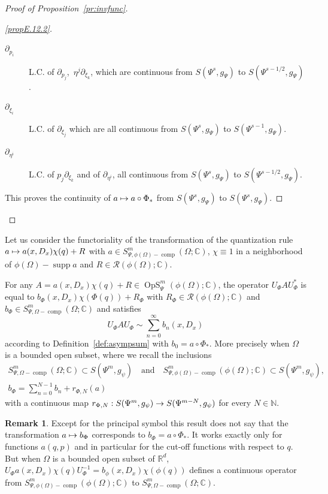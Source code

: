 \documentclass[10pt]{amsart}
\theoremstyle{definition}\newtheorem{defi}[theo]{Definition}\newtheorem{rema}[theo]{Remark}\newtheorem{exam}[theo]{Example}\newtheorem{exem}[theo]{Example}\newtheorem{nota}[theo]{Notation}
\newcommand{\C}{\mathbb{C}}
\newcommand{\R}{\mathbb{R}}
\newcommand{\N}{\mathbb{N}}
\newcommand{\clR}{\mathcal{R}}
\DeclareMathOperator{\OpS}{OpS}
\DeclareMathOperator{\ccomp}{comp}
\DeclareMathOperator{\suppp}{supp}
\renewcommand*{\to}{\mathchoice{\longrightarrow}{\rightarrow}{\rightarrow}{\rightarrow}}
\let\oldmapsto\mapsto
\renewcommand*{\mapsto}{\mathchoice{\longmapsto}{\oldmapsto}{\oldmapsto}{\oldmapsto}}
\newenvironment{proofc}[1][\proofname]{\begin{proof}[#1]}{\end{proof}}
\begin{document}
\begin{proofc}[{Proof of Proposition~\ref{pr:invfunc}}]
\begin{proof}[{\eqref{propE.12.2}}]
\begin{description}
\item[$\partial_{p_{i}}$] L.C. of $\partial_{p_{j}}$,\, $\eta^{j}\partial_{\xi_{k}}$, which are continuous from $S(\Psi^{s},g_{\Psi})$ to $S(\Psi^{s-1/2},g_{\Psi})$.
\item[$\partial_{\xi_{i}}$] L.C. of $\partial_{\xi_{j}}$ which are all continuous from $S(\Psi^{s},g_{\Psi})$ to $S(\Psi^{s-1},g_{\Psi})$.
\item[$\partial_{\eta^{i}}$] L.C. of $p_{j}\partial_{\xi_{k}}$ and of $\partial_{\eta^{i}}$, all continuous from $S(\Psi^{s},g_{\Psi})$ to $S(\Psi^{s-1/2},g_{\Psi})$.
\end{description} This proves the continuity of $a\mapsto a\circ \Phi_{*}$ from $S(\Psi^{s},g_{\Psi})$ to $S(\Psi^{s},g_{\Psi})$.
\end{proof}
\let\qed\relax
\end{proofc}

Let us consider the functoriality of the transformation of the quantization rule $a\mapsto a(x,D_{x})\chi(q)+R$ with $a\in S^{m}_{\Psi,\phi(\Omega)-\ccomp}(\Omega;\C)$, $\chi\equiv 1$ in a neighborhood of $\phi(\Omega)-\suppp a$ and $R\in \clR(\phi(\Omega);\C)$.

\pagebreak
\begin{prop}\label{pr:quantchang}
For any $A=a(x,D_{x})\chi(q)+R\in \OpS^{m}_{\Psi}(\phi(\Omega);\C)$, the operator $U_{\Phi}AU_{\Phi}^{*}$ is equal to $b_{\Phi}(x,D_{x})\chi(\Phi(q))+R_{\Phi}$ with $R_{\Phi}\in \clR(\phi(\Omega);\C)$ and $b_{\Phi}\in S^{m}_{\Psi,\Omega-\ccomp}(\Omega;\C)$ and satisfies
\[
U_{\Phi}AU_{\Phi}\sim \sum_{n=0}^{\infty} b_{n}(x,D_{x})
\]
according to Definition~\ref{def:asympsum} with $b_{0}=a\circ{\Phi}_{*}$. More precisely when $\Omega$ is a bounded open subset, where we recall the inclusions 
\begin{gather*}
S^{m}_{\Psi,\Omega-\ccomp}(\Omega;\C)\subset S(\Psi^{m},g_{\psi}) \quad\text{and}\quad S^{m}_{\Psi,\phi(\Omega)-\ccomp}(\phi(\Omega);\C)\subset S(\Psi^{m},g_{\psi}),\\
b_{\Phi}=\sum_{n=0}^{N-1}b_{n}+r_{\Phi,N}(a)
\end{gather*}
with a continuous map $r_{\Phi,N}:S(\Psi^{m},g_{\psi})\to S(\Psi^{m-N},g_{\psi})$ for every $N\in \N$.
\end{prop}
\begin{rema}
Except for the principal symbol this result does not say that the transformation $a\mapsto b_{\Phi}$ corresponds to $b_{\Phi}=a\circ \Phi_{*}$. It works exactly only for functions $a(q,p)$ and in particular for the cut-off functions with respect to $q$. But when $\Omega$ is a bounded open subset of $\R^{d}$, $U_{\Phi}a(x,D_{x})\chi(q)U_{\Phi}^{-1}=b_{\phi}(x,D_{x})\chi(\phi(q))$ defines a continuous operator from $S^{m}_{\Psi, \phi(\Omega)-\ccomp}(\phi(\Omega);\C)$ to $S^{m}_{\Psi, \Omega-\ccomp}(\Omega;\C)$.
\end{rema}
\end{document}
